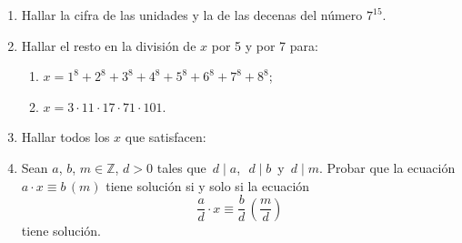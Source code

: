 \documentclass[a4paper,12pt,twoside,spanish,reqno]{amsbook}
\numberwithin{equation}{section}
\begin{document}
\begin{enumerate}
\item Hallar la cifra de las unidades y la de las decenas del n\'umero $7^{15}$.


\item Hallar el resto en la divisi\'on de $x$ por 5 y por 7 para:
 \begin{enumerate}
\item $x=1^8 + 2^8 + 3^8 + 4^8 + 5^8 + 6^8 + 7^8 + 8^8$;
\item $x=3\cdot 11\cdot 17\cdot 71\cdot 101$.
\end{enumerate}


\item Hallar todos los $x$ que satisfacen:

\item Sean $a$, $b$, $m \in {\mathbb Z}$, $d>0$ tales que  \,$d\mid a$,\,  \,$d\mid b$\, y \,$d\mid m$. Probar que la ecuación $a\cdot x \equiv b\,( m)$ tiene
solución si y solo si la ecuación
$$\frac{a}{d}\cdot x \equiv \frac{b}{d}\,\left(\frac{m}{d}\right)$$
tiene solución.


\end{enumerate}
\end{document}
